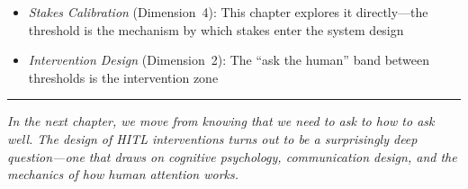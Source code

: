 \begin{itemize}
    \item \textit{Stakes Calibration} (Dimension~4): This chapter explores it directly---the threshold is the mechanism by which stakes enter the system design
    \item \textit{Intervention Design} (Dimension~2): The ``ask the human'' band between thresholds is the intervention zone
\end{itemize}

\bigskip
\begin{center}
\rule{0.5\textwidth}{0.4pt}
\end{center}
\bigskip

\noindent\textit{In the next chapter, we move from knowing that we need to ask to how to ask well. The design of HITL interventions turns out to be a surprisingly deep question---one that draws on cognitive psychology, communication design, and the mechanics of how human attention works.}
